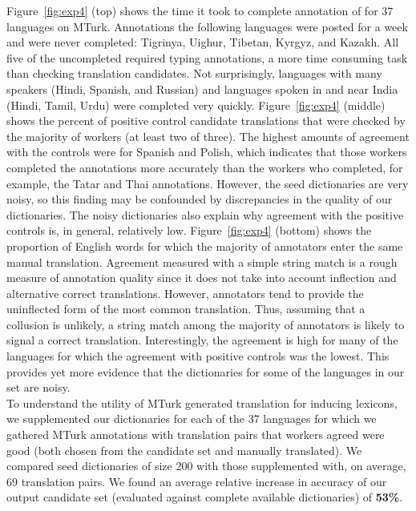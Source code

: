 \documentclass{article}
\newcommand{\figref}[1]{Figure~\ref{#1}}
\begin{document}
\figref{fig:exp4} (top) shows the time it took to complete annotation of for 37 languages on MTurk. Annotations the following languages were posted for a week and were never completed: Tigrinya, Uighur, Tibetan, Kyrgyz, and Kazakh. All five of the uncompleted required typing annotations, a more time consuming task than checking translation candidates. Not surprisingly, languages with many speakers (Hindi, Spanish, and Russian) and languages spoken in and near India (Hindi, Tamil, Urdu) were completed very quickly. \figref{fig:exp4} (middle) shows the percent of positive control candidate translations that were checked by the majority of workers (at least two of three). The highest amounts of agreement with the controls were for Spanish and Polish, which indicates that those workers completed the annotations more accurately than the workers who completed, for example, the Tatar and Thai annotations. However, the seed dictionaries are very noisy, so this finding may be confounded by discrepancies in the quality of our dictionaries. The noisy dictionaries also explain why agreement with the positive controls is, in general, relatively low. \figref{fig:exp4} (bottom) shows the proportion of English words for which the majority of annotators enter the same manual translation.  Agreement measured with a simple string match is a rough measure of annotation quality since it does not take into account inflection and alternative correct translations.  However, annotators tend to provide the uninflected form of the most common translation. Thus, assuming that a collusion is unlikely, a string match among the majority of annotators is likely to signal a correct translation.  Interestingly, the agreement is high for many of the languages for which the agreement with positive controls was the lowest.  This provides yet more evidence that the dictionaries for some of the languages in our set are noisy. \\

To understand the utility of MTurk generated translation for inducing lexicons, we supplemented our dictionaries for each of the 37 languages for which we gathered MTurk annotations with translation pairs that workers agreed were good (both chosen from the candidate set and manually translated). We compared seed dictionaries of size 200 with those supplemented with, on average, 69 translation pairs. We found an average relative increase in accuracy of our output candidate set (evaluated against complete available dictionaries) of {\bf 53\%}.\\
\end{document}
